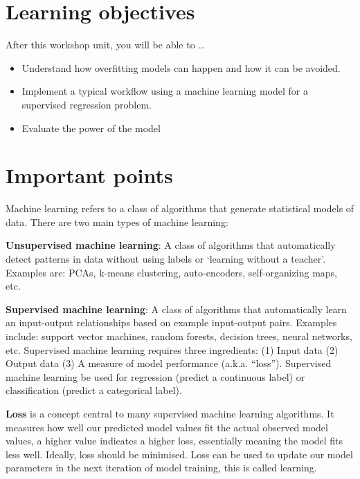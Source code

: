 \documentclass[
]{book}
\providecommand{\tightlist}{%
  \setlength{\itemsep}{0pt}\setlength{\parskip}{0pt}}
\begin{document}
\hypertarget{learning-objectives}{%
\section{Learning objectives}\label{learning-objectives}}

After this workshop unit, you will be able to \ldots{}

\begin{itemize}
\tightlist
\item
  Understand how overfitting models can happen and how it can be avoided.
\item
  Implement a typical workflow using a machine learning model for a supervised regression problem.
\item
  Evaluate the power of the model
\end{itemize}

\hypertarget{important-points}{%
\section{Important points}\label{important-points}}

Machine learning refers to a class of algorithms that generate statistical models of data. There are two main types of machine learning:

\textbf{Unsupervised machine learning}: A class of algorithms that automatically detect patterns in data without using labels or `learning without a teacher'. Examples are: PCAs, k-means clustering, auto-encoders, self-organizing maps, etc.

\textbf{Supervised machine learning}: A class of algorithms that automatically learn an input-output relationships based on example input-output pairs. Examples include: support vector machines, random forests, decision trees, neural networks, etc. Supervised machine learning requires three ingredients: (1) Input data (2) Output data (3) A measure of model performance (a.k.a. ``loss''). Supervised machine learning be used for regression (predict a continuous label) or classification (predict a categorical label).

\textbf{Loss} is a concept central to many supervised machine learning algorithms. It measures how well our predicted model values fit the actual observed model values, a higher value indicates a higher loss, essentially meaning the model fits less well. Ideally, loss should be minimised. Loss can be used to update our model parameters in the next iteration of model training, this is called learning.
\end{document}
